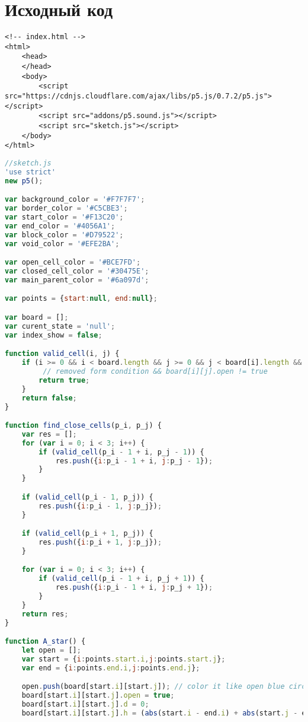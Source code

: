 \pagebreak

\section{Исходный код}

\begin{lstlisting}
<!-- index.html -->
<html>
    <head>
    </head>
    <body>
        <script src="https://cdnjs.cloudflare.com/ajax/libs/p5.js/0.7.2/p5.js"></script>
        <script src="addons/p5.sound.js"></script>
        <script src="sketch.js"></script>
    </body>
</html>

\end{lstlisting}

\begin{lstlisting}[language=Javascript]
//sketch.js
'use strict'
new p5();

var background_color = '#F7F7F7';
var border_color = '#C5CBE3';
var start_color = '#F13C20';
var end_color = '#4056A1';
var block_color = '#D79522';
var void_color = '#EFE2BA';

var open_cell_color = '#BCE7FD';
var closed_cell_color = '#30475E';
var main_parent_color = '#6a097d';

var points = {start:null, end:null};

var board = [];
var curent_state = 'null';
var index_show = false;

function valid_cell(i, j) {
	if (i >= 0 && i < board.length && j >= 0 && j < board[i].length && board[i][j].closed != true && board[i][j].color != block_color) {
		 // removed form condition && board[i][j].open != true
		return true;
	}
	return false;
}

function find_close_cells(p_i, p_j) {
	var res = [];
	for (var i = 0; i < 3; i++) {
		if (valid_cell(p_i - 1 + i, p_j - 1)) {
			res.push({i:p_i - 1 + i, j:p_j - 1});
		}
	}

	if (valid_cell(p_i - 1, p_j)) {
		res.push({i:p_i - 1, j:p_j});
	}

	if (valid_cell(p_i + 1, p_j)) {
		res.push({i:p_i + 1, j:p_j});
	}

	for (var i = 0; i < 3; i++) {
		if (valid_cell(p_i - 1 + i, p_j + 1)) {
			res.push({i:p_i - 1 + i, j:p_j + 1});
		}
	}
	return res;
}

function A_star() {
	let open = [];
	var start = {i:points.start.i,j:points.start.j};
	var end = {i:points.end.i,j:points.end.j};

	open.push(board[start.i][start.j]); // color it like open blue circle
	board[start.i][start.j].open = true;
	board[start.i][start.j].d = 0;
	board[start.i][start.j].h = (abs(start.i - end.i) + abs(start.j - end.j)) * 10;


\end{lstlisting}
